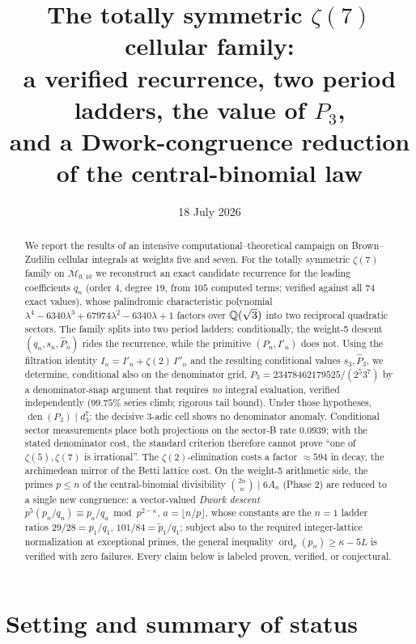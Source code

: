 \documentclass[11pt]{article}
\title{The totally symmetric $\zeta(7)$ cellular family:\\
a verified recurrence, two period ladders, the value of $P_3$,\\
and a Dwork-congruence reduction of the central-binomial law}
\author{}
\date{18 July 2026}
\theoremstyle{definition}\newtheorem{remark}[theorem]{Remark}
\DeclareMathOperator{\ord}{ord}\DeclareMathOperator{\den}{den}\DeclareMathOperator{\lcm}{lcm}
\newcommand{\wt}{\widetilde}\newcommand{\dn}{d_n}
\newcommand{\zt}[1]{\zeta(#1)}
\begin{document}
\maketitle

\begin{abstract}
We report the results of an intensive computational--theoretical campaign on
Brown--Zudilin cellular integrals at weights five and seven. For the totally
symmetric $\zeta(7)$ family on $\overline{\mathcal M}_{0,10}$ we reconstruct an
exact candidate recurrence for the leading coefficients $q_n$ (order $4$, degree
$19$, from $105$ computed terms; verified against all $74$ exact values), whose
palindromic characteristic polynomial
$\lambda^4-6340\lambda^3+67974\lambda^2-6340\lambda+1$ factors over
$\mathbb{Q}(\sqrt3)$ into two reciprocal quadratic sectors. The family splits into two
period ladders: conditionally, the weight-5 descent $(q_n,s_n,\hat P_n)$ rides
the recurrence, while the primitive $(P_n,I'_n)$ does not. Using the
filtration identity $I_n=I'_n+\zt2\,I''_n$ and the resulting conditional
values $s_3,\hat P_3$, we determine, conditional also on the denominator grid,
$P_3=23478462179525/(2^5 3^7)$ by a denominator-snap argument that requires
\emph{no} integral evaluation, verified independently ($99.75\%$ series
climb; rigorous tail bound). Under those hypotheses,
$\den(P_3)\mid d_3^7$: the decisive
$3$-adic cell shows no denominator anomaly. Conditional sector measurements
place both projections on the sector-B rate $0.0939$; with the stated
denominator cost, the standard criterion therefore cannot prove ``one of
$\zt5,\zt7$ is irrational''. The $\zt2$-elimination costs a factor
$\approx594$ in decay, the
archimedean mirror of the Betti lattice cost. On the weight-5 arithmetic side,
the primes $p\le n$ of the central-binomial divisibility
$\binom{2n}{n}\mid6A_n$ (Phase 2) are reduced to a single new congruence: a
vector-valued \emph{Dwork descent} $p^5(p_n/q_n)\equiv p_a/q_a \bmod p^{2-\kappa}$,
$a=\lfloor n/p\rfloor$, whose constants are the $n=1$ ladder ratios
$29/28=p_1/q_1$, $101/84=\wt p_1/q_1$; subject also to the required
integer-lattice normalization at exceptional primes, the general inequality
$\ord_p(p_n)\ge\kappa-5L$ is verified with zero failures. Every claim below is
labeled proven, verified, or conjectural.
\end{abstract}

\section{Setting and summary of status}
\end{document}
